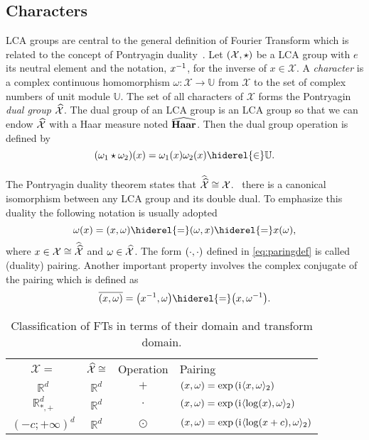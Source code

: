 \subsection{Characters}
\label{subsec:character}
\acf{LCA} groups are central to the general definition of Fourier Transform which is related to the concept of Pontryagin duality~\citep{folland1994course}.
Let $(\mathcal{X}, \star)$ be a \acs{LCA} group with $e$ its neutral element and the notation, ${x}^{-1}$, for the inverse of $x \in \mathcal{X}$. A \emph{character} is a complex continuous homomorphism $\omega:\mathcal{X}\to\mathbb{U}$ from $\mathcal{X}$ to the set of complex numbers of unit module $\mathbb{U}$. The set of all characters of $\mathcal{X}$ forms the Pontryagin \emph{dual  group} $\widehat{\mathcal{X}}$. The dual group of an \acs{LCA} group is an \acs{LCA} group so that we can endow $\widehat{\mathcal{X}}$ with a  Haar measure noted $\widehat{\mathbf{Haar}}$. Then the dual group operation is defined by
\begin{dmath*}
(\omega_1 \groupop \omega_2)(x)=\omega_1(x)\omega_2(x) \hiderel{\in} \mathbb{U}.
\end{dmath*}
\paragraph{}
The Pontryagin duality theorem states that $\widehat{\widehat{\mathcal{X}}}\cong \mathcal{X}$. \Ie~there is a canonical isomorphism between any \acs{LCA} group and its double dual. To emphasize this duality the following notation is usually adopted
\begin{dmath}
\label{eq:paringdef}
\omega(x)=\pairing{x,\omega}\hiderel{=}\pairing{\omega,x}\hiderel{=}x(\omega),
\end{dmath}
where $x\in\mathcal{X}\cong\widehat{\widehat{\mathcal{X}}}$ and $\omega\in\widehat{\mathcal{X}}$. The form $(\cdot,\cdot)$ defined in \cref{eq:paringdef} is called (duality) pairing. Another important property involves the complex conjugate of the pairing which is defined as
\begin{dmath}
\conj{\pairing{x,\omega}} = \pairing*{\inv{x},\omega}\hiderel{=}\pairing*{x,\inv{\omega}}.
\end{dmath}
\begin{table}[htb]
\caption{Classification of \acl{FT}s in terms of their domain and transform domain.}
\label{tab:dual_and_pairing}
\centering
\begin{tabularx}{\textwidth}{cccX}
\toprule
\multicolumn{1}{c}{$\mathcal{X}=$} & \multicolumn{1}{c}{$\widehat{\mathcal{X}}\cong$} & \multicolumn{1}{c}{Operation} & \multicolumn{1}{l}{Pairing} \\
\cmidrule{1-4}
$\mathbb{R}^d$ & $\mathbb{R}^d$ & $+$ & $(x,\omega) = \exp\left({\mathrm{i}\mkern1mu} \langle x, \omega\rangle_2\right)$ \\
$\mathbb{R}^d_{*,+}$ & $\mathbb{R}^d$ & $\cdot$ & $(x,\omega) =\exp\left( {\mathrm{i}\mkern1mu} \langle\log(x), \omega\rangle_2 \right)$ \\
$(-c;+\infty)^d$ & $\mathbb{R}^d$ & $\odot$ & $(x,\omega) =\exp\left( {\mathrm{i}\mkern1mu} \langle\log(x+c), \omega\rangle_2 \right)$ \\
\bottomrule
\end{tabularx}
\end{table}
